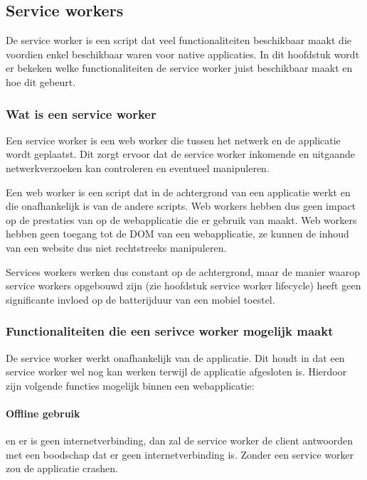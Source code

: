 \subsection{Service workers}

De service worker is een script dat veel functionaliteiten beschikbaar maakt die voordien enkel beschikbaar waren voor native applicaties. In dit hoofdstuk wordt er bekeken welke functionaliteiten de service worker juist beschikbaar maakt en hoe dit gebeurt. 



\subsubsection{Wat is een service worker}

Een service worker is een web worker die tussen het netwerk en de applicatie wordt geplaatst. Dit zorgt ervoor dat de service worker inkomende en uitgaande netwerkverzoeken kan controleren en eventueel manipuleren.
\autocite{Mozilla2020}

Een web worker is een script dat in de achtergrond van een applicatie werkt en die onafhankelijk is van de andere scripts. Web workers hebben dus geen impact op de prestaties van op de webapplicatie die er gebruik van maakt.  Web workers hebben geen toegang tot de DOM van een webapplicatie, ze kunnen de inhoud van een website dus niet rechtstreeks manipuleren.

\autocite{Verdu2015}
\autocite{Hiltunen2018}


Services workers werken dus constant op de achtergrond, maar de manier waarop service workers opgebouwd zijn (zie hoofdstuk service worker lifecycle) heeft geen significante invloed op de batterijduur van een mobiel toestel.

\autocite{Malavolta2016}


\subsubsection{Functionaliteiten die een serivce worker mogelijk maakt}

De service worker werkt onafhankelijk van de applicatie. Dit houdt in dat een service worker wel nog kan werken terwijl de applicatie afgesloten is. Hierdoor zijn volgende functies mogelijk binnen een webapplicatie:


\paragraph{Offline gebruik}
en er is geen internetverbinding, dan zal de service worker de client antwoorden met een boodschap dat er geen internetverbinding is. Zonder een service worker zou de applicatie crashen.

